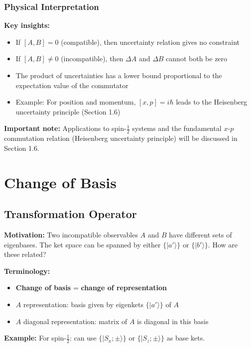 \documentclass[11pt,a4paper]{article}
\begin{document}
\subsubsection{Physical Interpretation}

\textbf{Key insights:}
\begin{itemize}
\item If $[A, B] = 0$ (compatible), then uncertainty relation gives no constraint
\item If $[A, B] \neq 0$ (incompatible), then $\Delta A$ and $\Delta B$ cannot both be zero
\item The product of uncertainties has a lower bound proportional to the expectation value of the commutator
\item Example: For position and momentum, $[x, p] = i\hbar$ leads to the Heisenberg uncertainty principle (Section 1.6)
\end{itemize}

\textbf{Important note:} Applications to spin-$\frac{1}{2}$ systems and the fundamental $x$-$p$ commutation relation (Heisenberg uncertainty principle) will be discussed in Section 1.6.
\newpage
\section{Change of Basis}

\subsection{Transformation Operator}

\textbf{Motivation:} Two incompatible observables $A$ and $B$ have different sets of eigenbases. The ket space can be spanned by either $\{|a'\rangle\}$ or $\{|b'\rangle\}$. How are these related?

\textbf{Terminology:}
\begin{itemize}
\item \textbf{Change of basis} = \textbf{change of representation}
\item $A$ representation: basis given by eigenkets $\{|a'\rangle\}$ of $A$
\item $A$ diagonal representation: matrix of $A$ is diagonal in this basis
\end{itemize}

\textbf{Example:} For spin-$\frac{1}{2}$: can use $\{|S_x; \pm\rangle\}$ or $\{|S_z; \pm\rangle\}$ as base kets.
\end{document}
